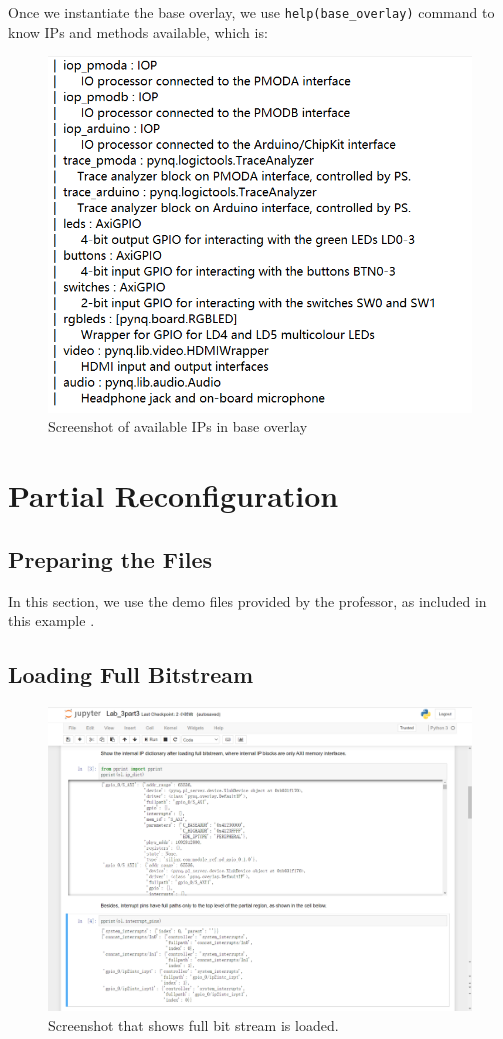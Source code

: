 \documentclass[a4paper]{article}
\begin{document}
Once we instantiate the base overlay, we use \texttt{help(base\_overlay)} command to know IPs and methods available, which is:
\begin{figure}[H]
    \centering
    \includegraphics[width=1\textwidth]{1-2.png}
    \caption{Screenshot of available IPs in base overlay}
\end{figure}

\section{Partial Reconfiguration}
\subsection{Preparing the Files}
In this section, we use the demo files provided by the professor, as included in this example \cite{partialReconfig}.
\subsection{Loading Full Bitstream}
\begin{figure}[H]
    \centering
    \includegraphics[width=1\textwidth]{1.png}
    \caption{Screenshot that shows full bit stream is loaded.}
\end{figure}
\end{document}
